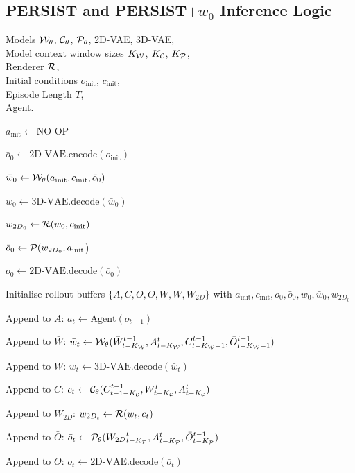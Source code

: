\documentclass{article}
\theoremstyle{plain}
\theoremstyle{definition}
\theoremstyle{remark}
\newlength{\algleftcol}
\newcommand{\AlgLeftBox}[1]{%
  \parbox[t]{\algleftcol}{\raggedright\strut\ignorespaces#1\unskip\strut}%
}
\let\OldState\State
\renewcommand{\State}[1]{%
  \OldState \AlgLeftBox{#1}%
}
\newcommand{\Input}[1]{%
  \Require \parbox[t]{\algleftcol}{\raggedright #1}%
}
\renewcommand{\Input}[1]{%
  \Require \AlgLeftBox{#1}%
}
\begin{document}
\subsection{PERSIST and PERSIST$+w_0$ Inference Logic}

\begin{algorithm}[htb!]
\centering
\caption{PERSIST inference logic.}\label{alg:PERSIST}
\begin{algorithmic}[1]
\Input{Models ${\mathcal{W}}_\theta$, ${\mathcal{C}}_\theta$, ${\mathcal{P}}_\theta$, 2D-VAE, 3D-VAE, \\ Model context window sizes $K_{{\mathcal{W}}}$, $K_{{\mathcal{C}}}$, $K_{{\mathcal{P}}}$, \\ 
Renderer ${\mathcal{R}}$, \\
Initial conditions $o_\text{init}$, $c_\text{init}$, \\
Episode Length $T$, \\
Agent.}
\State{$a_\text{init}\leftarrow \text{NO-OP}$} 
\State{$\bar{o}_0 \leftarrow \text{2D-VAE.encode}(o_\text{init})$}
\State{$\bar{w}_0 \leftarrow {\mathcal{W}}_\theta (a_\text{init}, c_\text{init}, \bar{o}_0)$}
\State{$w_0 \leftarrow \text{3D-VAE.decode}(\bar{w}_0)$}
\State{$w_{{2D}_0} \leftarrow {\mathcal{R}}(w_0,c_\text{init})$}
\State{$\bar{o}_0 \leftarrow {\mathcal{P}} (w_{{2D}_0}, a_\text{init}$)} 
\State{$o_0 \leftarrow \text{2D-VAE.decode}(\bar{o}_0)$}
\State{Initialise rollout buffers $\{A,C,O,\bar{O},W,\bar{W},W_{2D}\}$ with $a_\text{init},c_\text{init},o_0,\bar{o}_0,w_0,\bar{w}_0,w_{{2D}_0}$}
\State{Append to $A$: $a_t \leftarrow \text{Agent}(o_{t-1})$}
\State{Append to $\bar{W}$: $\bar{w}_t \leftarrow {\mathcal{W}}_\theta(\bar{W}^{t-1}_{t-K_{\mathcal{W}}}, A^t_{t-K_{\mathcal{W}}}, C^{t-1}_{t-K_{\mathcal{W}}-1}, \bar{O}^{t-1}_{t-K_{\mathcal{W}}-1})$}
\State{Append to $W$: $w_t \leftarrow \text{3D-VAE.decode}(\bar{w}_t)$}
\State{Append to $C$: $c_t \leftarrow {\mathcal{C}}_\theta (C^{t-1}_{t-1-K_{\mathcal{C}}}, W^t_{t-K_{\mathcal{C}}}, A^t_{t-K_{\mathcal{C}}})$}
\State{Append to $W_{2D}$: $w_{{2D}_t} \leftarrow {\mathcal{R}}(w_t,c_t)$}
\State{Append to $\bar{O}$: $\bar{o}_t \leftarrow {\mathcal{P}}_\theta ({W_{2D}}_{t-K_{\mathcal{P}}}^{t}, A^t_{t-K_{\mathcal{P}}}, \bar{O}^{t-1}_{t-K_{\mathcal{P}}})$}
\State{Append to $O$: $o_t \leftarrow \text{2D-VAE.decode}(\bar{o}_t)$}
\EndFor
\end{algorithmic}
\end{algorithm}
\end{document}

